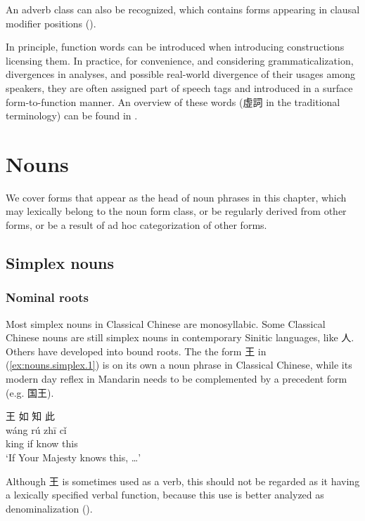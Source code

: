 \documentclass[UTF8, a4paper, oneside, scheme=plain, 12pt]{ctexrep}
\newcommand*{\citechap}[1]{Ch.~{#1}}
\newcommand{\translate}[1]{`#1'}
\begin{document}
An adverb class can also be recognized,
which contains forms appearing in clausal modifier positions ().

In principle, function words can be introduced when introducing constructions licensing them.
In practice, for convenience, and considering grammaticalization, divergences in analyses,
and possible real-world divergence of their usages among speakers,
they are often assigned part of speech tags and introduced in a surface form-to-function manner.
An overview of these words (虛詞 in the traditional terminology) can be found in \citet[\citechap{4}]{li2004grammar}.



\chapter{Nouns}

We cover forms that appear as the head of noun phrases in this chapter,
which may lexically belong to the noun form class, or be regularly derived from other forms,
or be a result of ad hoc categorization of other forms.

\section{Simplex nouns}

\subsection{Nominal roots}\label{sec:nouns.simplex.noun-root}

Most simplex nouns in Classical Chinese are monosyllabic.
Some Classical Chinese nouns are still simplex nouns in contemporary Sinitic languages, like 人.
Others have developed into bound roots.
The the form 王 in (\ref{ex:nouns.simplex.1}) is on its own a noun phrase in Classical Chinese,
while its modern day reflex in Mandarin needs to be complemented by a precedent form (e.g. 国王).

\begin{exe}
    \ex\label{ex:nouns.simplex.1}
    \glll 王 如 知 此 \\
    wáng rú zhī cǐ \\
    king if know this \\
    \glt\translate{If Your Majesty knows this, \dots}
\end{exe}

Although 王 is sometimes used as a verb,
this should not be regarded as it having a lexically specified verbal function,
because this use is better analyzed as denominalization ().
\end{document}
